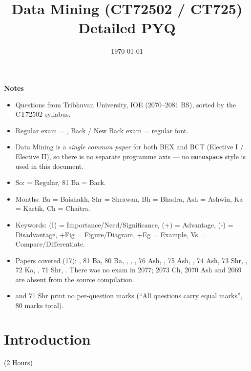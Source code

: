 \documentclass[12pt]{article}
\title{Data Mining (CT72502 / CT725)\\[0.4em]\large Detailed PYQ}
\author{}
\date{\today}
\begin{document}
\maketitle
\vspace{6cm}
\textbf{Notes}
\begin{itemize}[noitemsep]
  \item Questions from Tribhuvan University, IOE (2070--2081 BS), sorted by the CT72502 syllabus.
  \item Regular exam = , Back / New Back exam = regular font.
  \item Data Mining is a \emph{single common paper} for both BEX and BCT (Elective I / Elective II), so there is no separate programme axis --- no \texttt{monospace} style is used in this document.
  \item So:  = Regular, 81 Ba = Back.
  \item Months: Ba = Baishakh, Shr = Shrawan, Bh = Bhadra, Ash = Ashwin, Ka = Kartik, Ch = Chaitra.
  \item Keywords: (I) = Importance/Need/Significance, (+) = Advantage, (-) = Disadvantage, +Fig = Figure/Diagram, +Eg = Example, Vs = Compare/Differentiate.
  \item Papers covered (17): , 81 Ba, 80 Ba, , , , 76 Ash, , 75 Ash, , 74 Ash, 73 Shr, , 72 Ka, , 71 Shr, . There was no exam in 2077; 2073 Ch, 2070 Ash and 2069 are absent from the source compilation.
  \item {} and 71 Shr print no per-question marks (``All questions carry equal marks'', 80 marks total).
\end{itemize}
\pagebreak
\tableofcontents
\pagebreak

\section{Introduction}
\begin{center}(2 Hours)\end{center}
\end{document}

